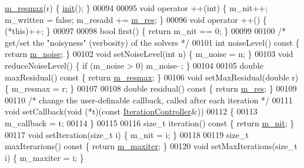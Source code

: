 \begin{DoxyCode}
      \hyperlink{class_eigen_1_1_iteration_controller_a5342235a082ee820516fd593ee1efeac}{m\_resmax}(r) \{ \hyperlink{structinit}{init}(); \}
00094 
00095     \textcolor{keywordtype}{void} operator ++(\textcolor{keywordtype}{int}) \{ m\_nit++; m\_written = \textcolor{keyword}{false}; m\_resadd += \hyperlink{class_eigen_1_1_iteration_controller_af60d33d2bdd09f3d00fd73ddc91fc1e6}{m\_res}; \}
00096     \textcolor{keywordtype}{void} operator ++() \{ (*this)++; \}
00097 
00098     \textcolor{keywordtype}{bool} first() \{ \textcolor{keywordflow}{return} m\_nit == 0; \}
00099 
00100     \textcolor{comment}{/* get/set the "noisyness" (verbosity) of the solvers */}
00101     \textcolor{keywordtype}{int} noiseLevel()\textcolor{keyword}{ const }\{ \textcolor{keywordflow}{return} \hyperlink{class_eigen_1_1_iteration_controller_afcff4288066c186967f15defcd833f5d}{m\_noise}; \}
00102     \textcolor{keywordtype}{void} setNoiseLevel(\textcolor{keywordtype}{int} n) \{ m\_noise = n; \}
00103     \textcolor{keywordtype}{void} reduceNoiseLevel() \{ \textcolor{keywordflow}{if} (m\_noise > 0) m\_noise--; \}
00104 
00105     \textcolor{keywordtype}{double} maxResidual()\textcolor{keyword}{ const }\{ \textcolor{keywordflow}{return} \hyperlink{class_eigen_1_1_iteration_controller_a5342235a082ee820516fd593ee1efeac}{m\_resmax}; \}
00106     \textcolor{keywordtype}{void} setMaxResidual(\textcolor{keywordtype}{double} r) \{ m\_resmax = r; \}
00107 
00108     \textcolor{keywordtype}{double} residual()\textcolor{keyword}{ const }\{ \textcolor{keywordflow}{return} \hyperlink{class_eigen_1_1_iteration_controller_af60d33d2bdd09f3d00fd73ddc91fc1e6}{m\_res}; \}
00109 
00110     \textcolor{comment}{/* change the user-definable callback, called after each iteration */}
00111     \textcolor{keywordtype}{void} setCallback(\textcolor{keywordtype}{void} (*t)(\textcolor{keyword}{const} \hyperlink{class_eigen_1_1_iteration_controller}{IterationController}&))
00112     \{
00113       m\_callback = t;
00114     \}
00115 
00116     \textcolor{keywordtype}{size\_t} iteration()\textcolor{keyword}{ const }\{ \textcolor{keywordflow}{return} \hyperlink{class_eigen_1_1_iteration_controller_ac9d122615471416cc827a3d8e8ea15f2}{m\_nit}; \}
00117     \textcolor{keywordtype}{void} setIteration(\textcolor{keywordtype}{size\_t} i) \{ m\_nit = i; \}
00118 
00119     \textcolor{keywordtype}{size\_t} maxIterarions()\textcolor{keyword}{ const }\{ \textcolor{keywordflow}{return} \hyperlink{class_eigen_1_1_iteration_controller_a42f72b0f3d490a6ceaa7bc76a51c1471}{m\_maxiter}; \}
00120     \textcolor{keywordtype}{void} setMaxIterations(\textcolor{keywordtype}{size\_t} i) \{ m\_maxiter = i; \}

\end{DoxyCode}
